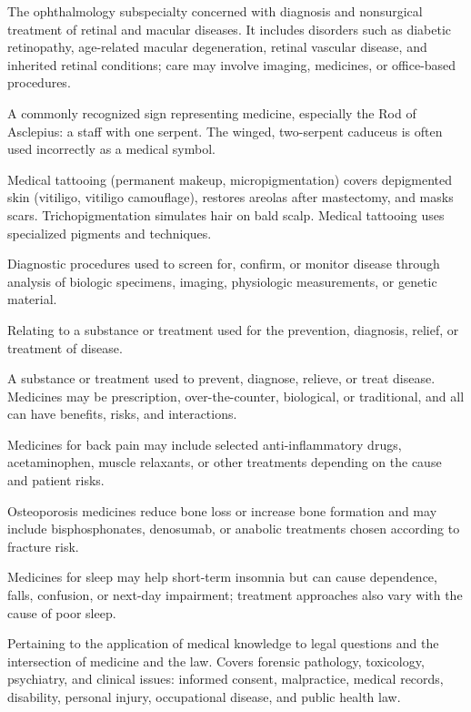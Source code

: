  The ophthalmology subspecialty concerned with diagnosis and nonsurgical treatment
of retinal and macular diseases. It includes disorders such as diabetic retinopathy,
age-related macular degeneration, retinal vascular disease, and inherited retinal conditions;
care may involve imaging, medicines, or office-based procedures.

 A commonly recognized sign representing medicine, especially the Rod of Asclepius: a staff with one serpent. The winged, two-serpent caduceus is often used incorrectly as a medical symbol.

 Medical tattooing (permanent makeup, micropigmentation) covers depigmented skin
(vitiligo, vitiligo camouflage), restores areolas after mastectomy, and masks scars.
Trichopigmentation simulates hair on bald scalp. Medical tattooing uses specialized
pigments and techniques.

 Diagnostic procedures used to screen for, confirm, or monitor disease through analysis
of biologic specimens, imaging, physiologic measurements, or genetic material.

 Relating to a substance or treatment used for the prevention, diagnosis, relief, or treatment of disease.

 A substance or treatment used to prevent, diagnose, relieve, or treat disease. Medicines may be prescription, over-the-counter, biological, or traditional, and all can have benefits, risks, and interactions.

 Medicines for back pain may include selected anti-inflammatory drugs, acetaminophen, muscle relaxants, or other treatments depending on the cause and patient risks.

 Osteoporosis medicines reduce bone loss or increase bone formation and may include bisphosphonates, denosumab, or anabolic treatments chosen according to fracture risk.

 Medicines for sleep may help short-term insomnia but can cause dependence, falls, confusion, or next-day impairment; treatment approaches also vary with the cause of poor sleep.

 Pertaining to the application of medical knowledge to legal questions and the
intersection of medicine and the law. Covers forensic pathology, toxicology, psychiatry,
and clinical issues: informed consent, malpractice, medical records, disability,
personal injury, occupational disease, and public health law.

